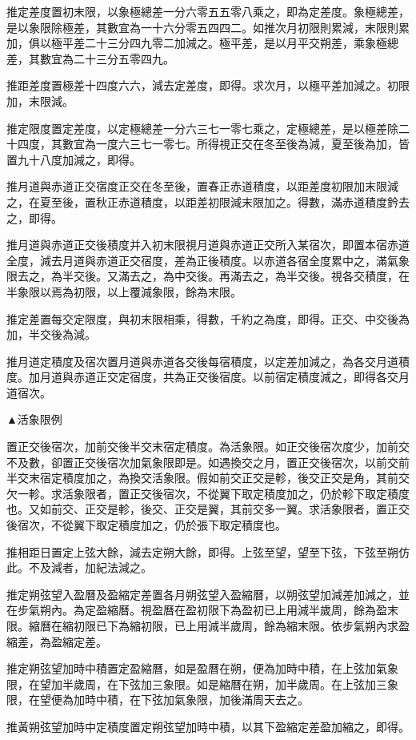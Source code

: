 推定差度置初末限，以象極總差一分六零五五零八乘之，即為定差度。象極總差，是以象限除極差，其數宜為一十六分零五四四二。如推次月初限則累減，末限則累加，俱以極平差二十三分四九零二加減之。極平差，是以月平交朔差，乘象極總差，其數宜為二十三分五零四九。

推距差度置極差十四度六六，減去定差度，即得。求次月，以極平差加減之。初限加，末限減。

推定限度置定差度，以定極總差一分六三七一零七乘之，定極總差，是以極差除二十四度，其數宜為一度六三七一零七。所得視正交在冬至後為減，夏至後為加，皆置九十八度加減之，即得。

推月道與赤道正交宿度正交在冬至後，置春正赤道積度，以距差度初限加末限減之，在夏至後，置秋正赤道積度，以距差初限減末限加之。得數，滿赤道積度鈐去之，即得。

推月道與赤道正交後積度并入初末限視月道與赤道正交所入某宿次，即置本宿赤道全度，減去月道與赤道正交宿度，差為正後積度。以赤道各宿全度累中之，滿氣象限去之，為半交後。又滿去之，為中交後。再滿去之，為半交後。視各交積度，在半象限以焉為初限，以上覆減象限，餘為末限。

推定差置每交定限度，與初末限相乘，得數，千約之為度，即得。正交、中交後為加，半交後為減。

推月道定積度及宿次置月道與赤道各交後每宿積度，以定差加減之，為各交月道積度。加月道與赤道正交定宿度，共為正交後宿度。以前宿定積度減之，即得各交月道宿次。

▲活象限例

置正交後宿次，加前交後半交末宿定積度。為活象限。如正交後宿次度少，加前交不及數，卻置正交後宿次加氣象限即是。如遇換交之月，置正交後宿次，以前交前半交末宿定積度加之，為換交活象限。假如前交正交是軫，後交正交是角，其前交欠一軫。求活象限者，置正交後宿次，不從翼下取定積度加之，仍於軫下取定積度也。又如前交、正交是軫，後交、正交是翼，其前交多一翼。求活象限者，置正交後宿次，不從翼下取定積度加之，仍於張下取定積度也。

推相距日置定上弦大餘，減去定朔大餘，即得。上弦至望，望至下弦，下弦至朔仿此。不及減者，加紀法減之。

推定朔弦望入盈曆及盈縮定差置各月朔弦望入盈縮曆，以朔弦望加減差加減之，並在步氣朔內。為定盈縮曆。視盈曆在盈初限下為盈初已上用減半歲周，餘為盈末限。縮曆在縮初限已下為縮初限，已上用減半歲周，餘為縮末限。依步氣朔內求盈縮差，為盈縮定差。

推定朔弦望加時中積置定盈縮曆，如是盈曆在朔，便為加時中積，在上弦加氣象限，在望加半歲周，在下弦加三象限。如是縮曆在朔，加半歲周。在上弦加三象限，在望便為加時中積，在下弦加氣象限，加後滿周天去之。

推黃朔弦望加時中定積度置定朔弦望加時中積，以其下盈縮定差盈加縮之，即得。

